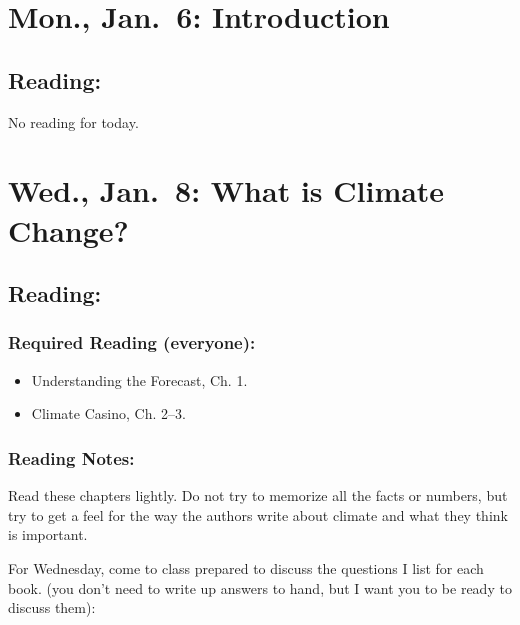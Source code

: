 \documentclass[
]{article}
\providecommand{\tightlist}{%
  \setlength{\itemsep}{0pt}\setlength{\parskip}{0pt}}
\begin{document}
\hypertarget{mon.-jan.-6-introduction}{%
\section{Mon., Jan.~6: Introduction}\label{mon.-jan.-6-introduction}}

\hypertarget{reading}{%
\subsection{Reading:}\label{reading}}

No reading for today.

\hypertarget{wed.-jan.-8-what-is-climate-change}{%
\section{Wed., Jan.~8: What is Climate
Change?}\label{wed.-jan.-8-what-is-climate-change}}

\hypertarget{reading-1}{%
\subsection{Reading:}\label{reading-1}}

\hypertarget{required-reading-everyone}{%
\subsubsection{Required Reading
(everyone):}\label{required-reading-everyone}}

\begin{itemize}
\tightlist
\item
  Understanding the Forecast, Ch. 1.
\item
  Climate Casino, Ch. 2--3.
\end{itemize}

\hypertarget{reading-notes}{%
\subsubsection{Reading Notes:}\label{reading-notes}}

Read these chapters lightly. Do not try to memorize all the facts or
numbers, but try to get a feel for the way the authors write about
climate and what they think is important.

For Wednesday, come to class prepared to discuss the questions I list
for each book. (you don't need to write up answers to hand, but I want
you to be ready to discuss them):
\end{document}
